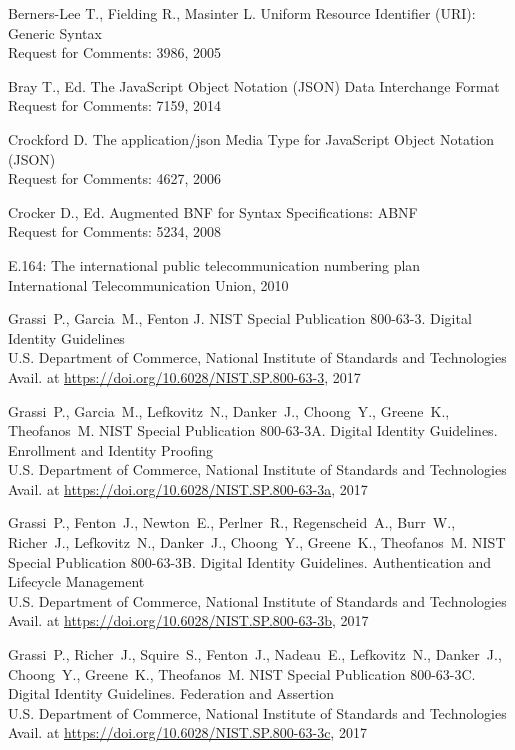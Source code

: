 \clearpage
\begin{thebibliography}{99}

Berners-Lee T., Fielding R., Masinter L. 
Uniform Resource Identifier (URI): Generic Syntax\\
{\small Request for Comments: 3986, 2005}

Bray T., Ed.
The JavaScript Object Notation (JSON) Data Interchange Format\\
{\small Request for Comments: 7159, 2014}

Crockford D.
The application/json Media Type for JavaScript Object Notation (JSON)\\
{\small Request for Comments: 4627, 2006}

Crocker D., Ed.
Augmented BNF for Syntax Specifications: ABNF\\
{\small Request for Comments: 5234, 2008}

E.164: The international public telecommunication numbering plan\\
{\small International Telecommunication Union, 2010}

Grassi~P., Garcia~M., Fenton J.
NIST Special Publication 800-63-3. Digital Identity Guidelines\\
U.S. Department of Commerce, National Institute of Standards and Technologies
{\small Avail. at \url{https://doi.org/10.6028/NIST.SP.800-63-3}, 2017}

Grassi~P., Garcia~M., 
Lefkovitz~N., Danker~J., 
Choong~Y., Greene~K., Theofanos~M. 
NIST Special Publication 800-63-3A. Digital Identity Guidelines. Enrollment and 
Identity Proofing\\ 
U.S. Department of Commerce, National Institute of Standards and Technologies
{\small Avail. at \url{https://doi.org/10.6028/NIST.SP.800-63-3a}, 2017}

Grassi~P., Fenton~J., Newton~E., Perlner~R., Regenscheid~A., Burr~W., Richer~J., 
Lefkovitz~N., Danker~J., 
Choong~Y., Greene~K., Theofanos~M. 
NIST Special Publication 800-63-3B. Digital Identity Guidelines. 
Authentication and Lifecycle Management\\ 
U.S. Department of Commerce, National Institute of Standards and Technologies
{\small Avail. at \url{https://doi.org/10.6028/NIST.SP.800-63-3b}, 2017}

Grassi~P., Richer~J., Squire~S., Fenton~J., Nadeau~E., 
Lefkovitz~N., Danker~J., 
Choong~Y., Greene~K., Theofanos~M.
NIST Special Publication 800-63-3C. Digital Identity Guidelines. 
Federation and Assertion\\ 
U.S. Department of Commerce, National Institute of Standards and Technologies
{\small Avail. at 
\url{https://doi.org/10.6028/NIST.SP.800-63-3c}, 2017}


\end{thebibliography}
